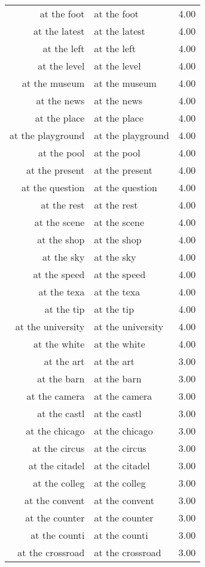 \begin{table}[ht]
\begin{tabular}{rlr}
  at the foot & at the foot & 4.00 \\ 
  at the latest & at the latest & 4.00 \\ 
  at the left & at the left & 4.00 \\ 
  at the level & at the level & 4.00 \\ 
  at the museum & at the museum & 4.00 \\ 
  at the news & at the news & 4.00 \\ 
  at the place & at the place & 4.00 \\ 
  at the playground & at the playground & 4.00 \\ 
  at the pool & at the pool & 4.00 \\ 
  at the present & at the present & 4.00 \\ 
  at the question & at the question & 4.00 \\ 
  at the rest & at the rest & 4.00 \\ 
  at the scene & at the scene & 4.00 \\ 
  at the shop & at the shop & 4.00 \\ 
  at the sky & at the sky & 4.00 \\ 
  at the speed & at the speed & 4.00 \\ 
  at the texa & at the texa & 4.00 \\ 
  at the tip & at the tip & 4.00 \\ 
  at the university & at the university & 4.00 \\ 
  at the white & at the white & 4.00 \\ 
  at the art & at the art & 3.00 \\ 
  at the barn & at the barn & 3.00 \\ 
  at the camera & at the camera & 3.00 \\ 
  at the castl & at the castl & 3.00 \\ 
  at the chicago & at the chicago & 3.00 \\ 
  at the circus & at the circus & 3.00 \\ 
  at the citadel & at the citadel & 3.00 \\ 
  at the colleg & at the colleg & 3.00 \\ 
  at the convent & at the convent & 3.00 \\ 
  at the counter & at the counter & 3.00 \\ 
  at the counti & at the counti & 3.00 \\ 
  at the crossroad & at the crossroad & 3.00 \\ 

\end{tabular}
\end{table}
